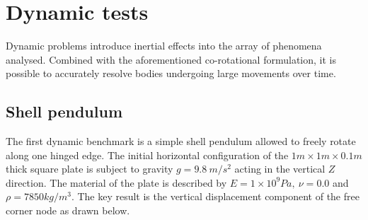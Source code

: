 \section{Dynamic tests}

Dynamic problems introduce inertial effects into the array of phenomena analysed. Combined with the aforementioned co-rotational formulation, it is possible to accurately resolve bodies undergoing large movements over time.

\subsection{Shell pendulum}
\label{validation:shell pendulum}
The first dynamic benchmark is a simple shell pendulum allowed to freely rotate along one hinged edge. The initial horizontal configuration of the $1m\times1m\times0.1m$ thick square plate is subject to gravity $g = 9.8\ m/s^2$ acting in the vertical $Z$ direction. The material of the plate is described by $E = 1\times 10^9 Pa,\ \nu = 0.0$ and $\rho = 7850 kg/m^3$. The key result is the vertical displacement component of the free corner node as drawn below.

